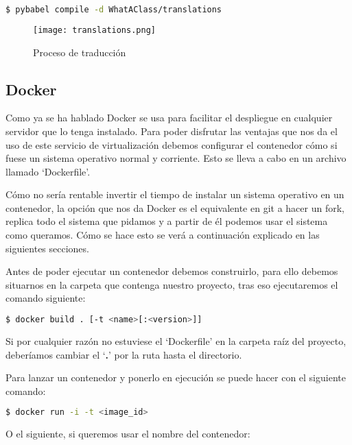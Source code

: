 \begin{lstlisting}[language=bash]
    $ pybabel compile -d WhatAClass/translations
\end{lstlisting}

\begin{figure}
	\centering
	\texttt{[image: translations.png]}
	\caption{Proceso de traducción}\label{fig:translations.png}
\end{figure}



\subsection{Docker}

Como ya se ha hablado Docker \cite{dock, learndock, orchdock} se usa para facilitar el despliegue en cualquier servidor que lo tenga instalado. Para poder disfrutar las ventajas que nos da el uso de este servicio de virtualización debemos configurar el contenedor cómo si fuese un sistema operativo normal y corriente. Esto se lleva a cabo en un archivo llamado `Dockerfile'.

Cómo no sería rentable invertir el tiempo de instalar un sistema operativo en un contenedor, la opción que nos da Docker es el equivalente en git a hacer un fork, replica todo el sistema que pidamos y a partir de él podemos usar el sistema como queramos. Cómo se hace esto se verá a continuación explicado en las siguientes secciones.

Antes de poder ejecutar un contenedor debemos construirlo, para ello debemos situarnos en la carpeta que contenga nuestro proyecto, tras eso ejecutaremos el comando siguiente:

\lstset{style=linestyle}
\begin{lstlisting}[language=bash]
    $ docker build . [-t <name>[:<version>]]
\end{lstlisting}

Si por cualquier razón no estuviese el `Dockerfile' en la carpeta raíz del proyecto, deberíamos cambiar el `\textbf{.}' por la ruta hasta el directorio.

Para lanzar un contenedor y ponerlo en ejecución se puede hacer con el siguiente comando:

\lstset{style=linestyle}
\begin{lstlisting}[language=bash]
    $ docker run -i -t <image_id>
\end{lstlisting}

O el siguiente, si queremos usar el nombre del contenedor:

